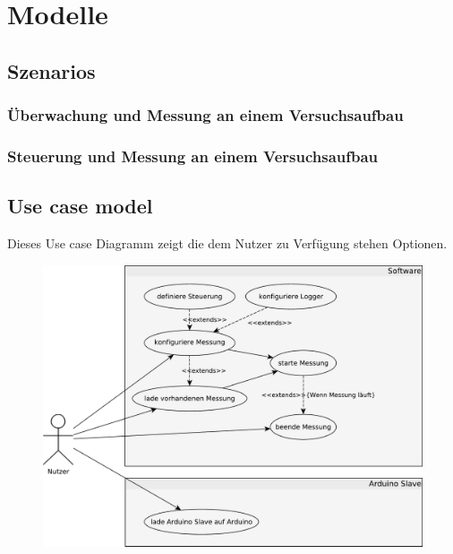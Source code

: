 \chapter{Modelle}
\section{Szenarios}
\subsection{Überwachung und Messung an einem Versuchsaufbau}
\subsection{Steuerung und Messung an einem Versuchsaufbau}
\section{Use case model}
Dieses Use case Diagramm zeigt die dem Nutzer zu Verfügung stehen Optionen.
\begin{figure}[H]
 \centering
 \includegraphics[width=\textwidth, keepaspectratio=true]{../Diagramme/BachelorUseCase1.pdf}
\end{figure}

